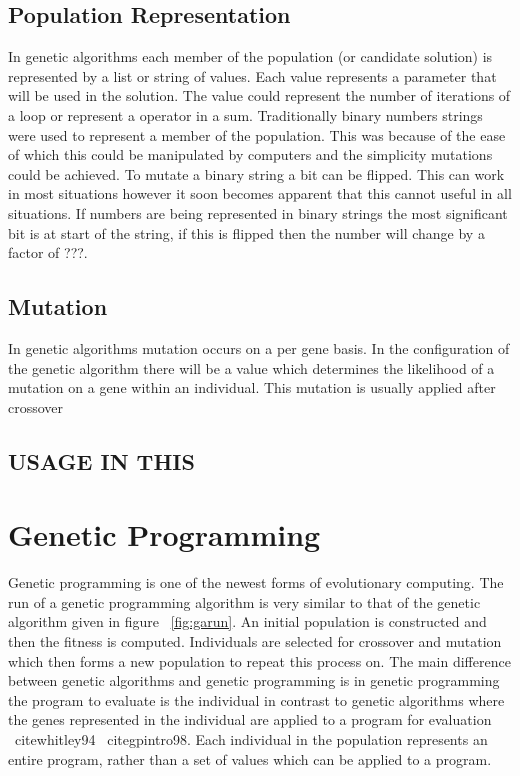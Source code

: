 \documentclass[12pt]{article}
\begin{document}
\subsection{Population Representation}
In genetic algorithms each member of the population (or candidate solution) is represented by a list or string of values.
Each value represents a parameter that will be used in the solution.
The value could represent the number of iterations of a loop or represent a operator in a sum.
Traditionally binary numbers strings were used to represent a member of the population.
This was because of the ease of which this could be manipulated by computers and the simplicity mutations could be achieved.
To mutate a binary string a bit can be flipped.
This can work in most situations however it soon becomes apparent that this cannot useful in all situations.
If numbers are being represented in binary strings the most significant bit is at start of the string, if this is flipped 
then the number will change by a factor of ???.


\subsection{Mutation}
In genetic algorithms mutation occurs on a per gene basis. In the configuration of the genetic algorithm there will be a value which 
determines the likelihood of a mutation on a gene within an individual. This mutation is usually applied after crossover 

\subsection{USAGE IN THIS}

\section{Genetic Programming}
Genetic programming is one of the newest forms of evolutionary computing. 
The run of a genetic programming algorithm is very similar to that of the genetic algorithm given in figure ~\ref{fig:garun}. An initial
population is constructed and then the fitness is computed. Individuals are selected for crossover and mutation which then forms a new 
population to repeat this process on. The main difference between genetic algorithms and genetic programming is in genetic programming
the program to evaluate is the individual in contrast to genetic algorithms where the genes represented in the individual are applied to
a program for evaluation ~cite{whitley94} ~cite{gpintro98}. Each individual in the population represents an entire program, rather than a set of values which can be
applied to a program. 
\end{document}
